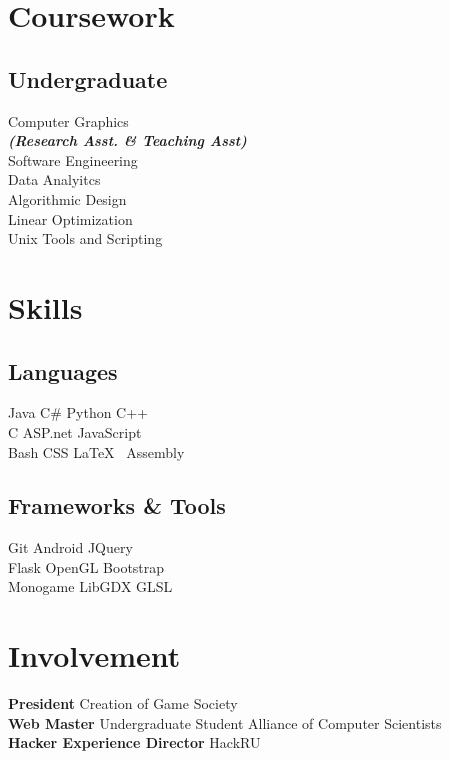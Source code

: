 \documentclass[]{deedy-resume-openfont}
\begin{document}
\begin{minipage}[t]{0.33\textwidth}

\section{Coursework}
\subsection{Undergraduate}
Computer Graphics \\
{\footnotesize \textit{\textbf{(Research Asst. \& Teaching Asst) }}} \\
Software Engineering \\
Data Analyitcs \\
Algorithmic Design \\
Linear Optimization \\  
Unix Tools and Scripting \\
\sectionsep


\section{Skills}
\subsection{Languages}
Java \textbullet{} C\# \textbullet{} Python \textbullet{} C++ \\
C\textbullet{} ASP.net \textbullet{} JavaScript \\ 
Bash\textbullet{} CSS \textbullet{} \LaTeX\ \textbullet{} Assembly \\
\sectionsep
\subsection{Frameworks \& Tools}
Git \textbullet{}  Android \textbullet{} JQuery  \\
Flask\textbullet{} OpenGL\textbullet{} Bootstrap \\ 
Monogame \textbullet{} LibGDX \textbullet{} GLSL


\section{Involvement}
\textbf{President}  \textbullet{} Creation of Game Society \\ 
\textbf{Web Master} \textbullet{} Undergraduate Student Alliance of Computer Scientists\\ 
\textbf{Hacker Experience Director} \textbullet{} HackRU \\
\sectionsep


%
%

\end{minipage} 
\end{document}
